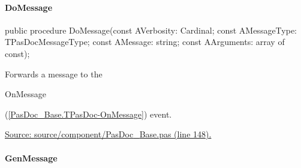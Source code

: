 \documentclass{report}
\newif\ifpdf
\begin{document}
\paragraph*{DoMessage}\hspace*{\fill}

\label{PasDoc_Base.TPasDoc-DoMessage}
\begin{list}{}{
\setlength{\itemindent}{0cm}
\setlength{\listparindent}{0cm}
\setlength{\leftmargin}{\evensidemargin}
\addtolength{\leftmargin}{\tmplength}
\settowidth{\labelsep}{X}
\addtolength{\leftmargin}{\labelsep}
\setlength{\labelwidth}{\tmplength}
}
\item[\textbf{Declaration}\hfill]
\ifpdf
\begin{flushleft}
\fi
\begin{ttfamily}
public procedure DoMessage(const AVerbosity: Cardinal; const AMessageType: TPasDocMessageType; const AMessage: string; const AArguments: array of const);\end{ttfamily}

\ifpdf
\end{flushleft}
\fi

\par
\item[\textbf{Description}]
Forwards a message to the \begin{ttfamily}OnMessage\end{ttfamily}(\ref{PasDoc_Base.TPasDoc-OnMessage}) event.\par
\href{https://github.com/pasdoc/pasdoc/blob/master/source/component/PasDoc_Base.pas#L148}{Source: source/component/PasDoc{\_}Base.pas (line 148).}

\end{list}
\paragraph*{GenMessage}\hspace*{\fill}
\end{document}
